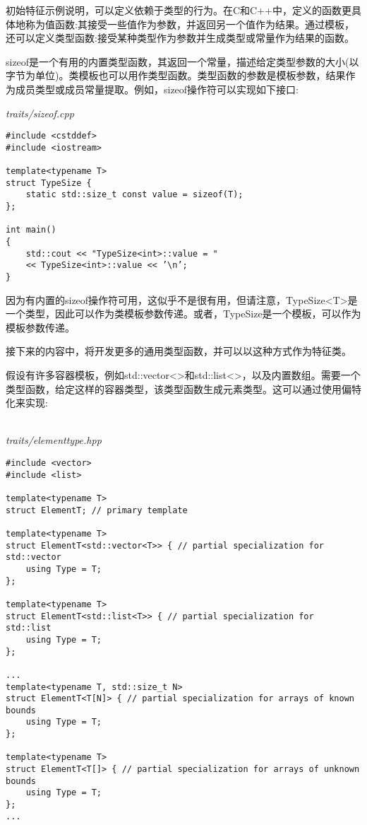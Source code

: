 
初始特征示例说明，可以定义依赖于类型的行为。在C和C++中，定义的函数更具体地称为值函数:其接受一些值作为参数，并返回另一个值作为结果。通过模板，还可以定义类型函数:接受某种类型作为参数并生成类型或常量作为结果的函数。

sizeof是一个有用的内置类型函数，其返回一个常量，描述给定类型参数的大小(以字节为单位)。类模板也可以用作类型函数。类型函数的参数是模板参数，结果作为成员类型或成员常量提取。例如，sizeof操作符可以实现如下接口:

\noindent
\textit{traits/sizeof.cpp}
\begin{lstlisting}[style=styleCXX]
#include <cstddef>
#include <iostream>

template<typename T>
struct TypeSize {
	static std::size_t const value = sizeof(T);
};

int main()
{
	std::cout << "TypeSize<int>::value = "
	<< TypeSize<int>::value << ’\n’;
}
\end{lstlisting}

因为有内置的sizeof操作符可用，这似乎不是很有用，但请注意，TypeSize<T>是一个类型，因此可以作为类模板参数传递。或者，TypeSize是一个模板，可以作为模板参数传递。

接下来的内容中，将开发更多的通用类型函数，并可以以这种方式作为特征类。


假设有许多容器模板，例如std::vector<>和std::list<>，以及内置数组。需要一个类型函数，给定这样的容器类型，该类型函数生成元素类型。这可以通过使用偏特化来实现:

\hspace*{\fill} \\ %
\noindent
\textit{traits/elementtype.hpp}
\begin{lstlisting}[style=styleCXX]
#include <vector>
#include <list>

template<typename T>
struct ElementT; // primary template

template<typename T>
struct ElementT<std::vector<T>> { // partial specialization for std::vector
	using Type = T;
};

template<typename T>
struct ElementT<std::list<T>> { // partial specialization for std::list
	using Type = T;
};

...
template<typename T, std::size_t N>
struct ElementT<T[N]> { // partial specialization for arrays of known bounds
	using Type = T;
};

template<typename T>
struct ElementT<T[]> { // partial specialization for arrays of unknown bounds
	using Type = T;
};
...
\end{lstlisting}

